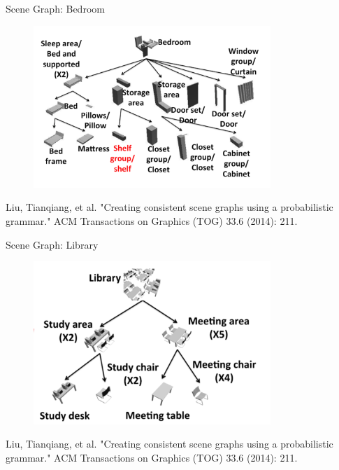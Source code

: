 \documentclass{beamer}
\begin{document}
\begin{frame}{Scene Graph: Bedroom}

\begin{figure}[t]
	\centering
    \includegraphics[width=0.8\textwidth]{SceneGraphBedroom.png}
\end{figure}

\tiny Liu, Tianqiang, et al. "Creating consistent scene graphs using a probabilistic grammar." ACM Transactions on Graphics (TOG) 33.6 (2014): 211.

\end{frame}

\begin{frame}{Scene Graph: Library}

\begin{figure}[t]
	\centering
    \includegraphics[width=0.8\textwidth]{SceneGraphLibrary.png}
\end{figure}

\tiny Liu, Tianqiang, et al. "Creating consistent scene graphs using a probabilistic grammar." ACM Transactions on Graphics (TOG) 33.6 (2014): 211.

\end{frame}
\end{document}
